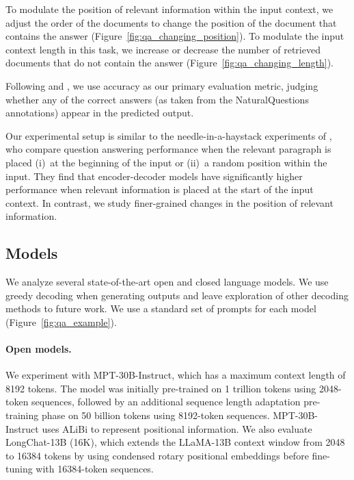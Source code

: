 \documentclass[11pt,a4paper]{article}
\newcommand{\mptinstruct}[0]{MPT-30B-Instruct\xspace}
\newcommand{\longchat}[0]{LongChat-13B (16K)\xspace}
\begin{document}
To modulate the position of relevant information within the input context, we adjust the order of the documents to change the position of the document that contains the answer (Figure~\ref{fig:qa_changing_position}).
To modulate the input context length in this task, we increase or decrease the number of retrieved documents that do not contain the answer (Figure~\ref{fig:qa_changing_length}).

Following \citet{kandpal2022large} and \citet{mallen2023trust}, we use accuracy as our primary evaluation metric, judging whether any of the correct answers (as taken from the NaturalQuestions annotations) appear in the predicted output.

Our experimental setup is similar to the needle-in-a-haystack experiments of \citet{ivgi-etal-2023-efficient}, who compare question answering performance when the relevant paragraph is placed (i)~at the beginning of the input or (ii)~a random position within the input. They find that encoder-decoder models have significantly higher performance when relevant information is placed at the start of the input context. In contrast, we study finer-grained changes in the position of relevant information.

\subsection{Models}\label{sec:models}

We analyze several state-of-the-art open and closed language models. We use greedy decoding when generating outputs and leave exploration of other decoding methods to future work. We use a standard set of prompts for each model (Figure~\ref{fig:qa_example}).

\paragraph{Open models.} We experiment with \mptinstruct, which has a maximum context length of 8192 tokens. The model was initially pre-trained on 1 trillion tokens using 2048-token sequences, followed by an additional sequence length adaptation pre-training phase on 50 billion tokens using 8192-token sequences. \mptinstruct uses ALiBi \citep{press2022train} to represent positional information.
We also evaluate \longchat \citep{longchat2023}, which extends the LLaMA-13B \citep{touvron2023llama} context window from 2048 to 16384 tokens by using condensed rotary positional embeddings before fine-tuning with 16384-token sequences.
\end{document}
